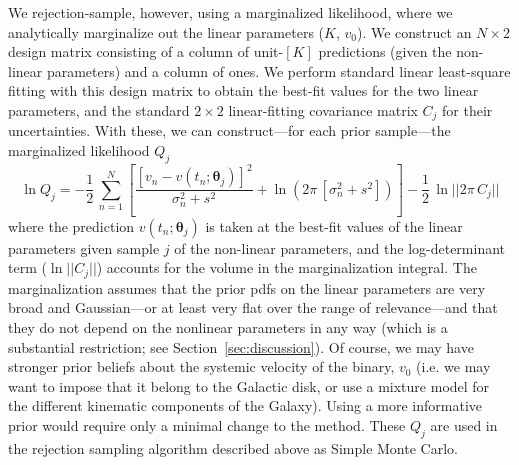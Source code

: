 \documentclass[manuscript, letterpaper]{aastex6}
\newcommand{\sectionname}{Section}
\newcommand{\bs}[1]{\boldsymbol{#1}}
\begin{document}
We rejection-sample, however, using a marginalized likelihood, where we
analytically marginalize out the linear parameters ($K$, $v_0$).
We construct an $N \times 2$ design matrix consisting of a column of unit-$[K]$
predictions (given the non-linear parameters) and a column of ones.
We perform standard linear least-square fitting with this design
matrix to obtain the best-fit values for the two linear parameters,
and the standard $2\times 2$ linear-fitting covariance matrix $C_j$ for their
uncertainties.
With these, we can construct---for each prior sample---the marginalized
likelihood $Q_j$
\begin{equation}
\ln Q_j = -\frac{1}{2}\,\sum_{n=1}^N \left[\frac{[v_n - v(t_n;\bs{\theta}_j)]^2}{\sigma_n^2 + s^2}
 +\ln \left(2\pi\,[\sigma_n^2 + s^2]\right) \right] -\frac{1}{2}\,\ln ||2\pi\,C_j||
\end{equation}
where the prediction $v(t_n;\bs{\theta}_j)$ is taken at the best-fit values of
the linear parameters given sample $j$ of the non-linear parameters, and the
log-determinant term ($\ln ||C_j||$) accounts for the volume in the
marginalization integral.
The marginalization assumes that the prior pdfs on the linear parameters
are very broad and Gaussian---or
at least very flat over the range of relevance---and that they do not depend
on the nonlinear parameters in any way (which is a substantial restriction;
see \sectionname~\ref{sec:discussion}).
Of course, we may have stronger prior beliefs about the systemic velocity of the
binary, $v_0$ (i.e. we may want to impose that it belong to the Galactic disk,
or use a mixture model for the different kinematic components of the Galaxy).
Using a more informative prior would require only a minimal change to the
method.
These $Q_j$ are used in the rejection sampling algorithm described above
as Simple Monte Carlo.
\end{document}
